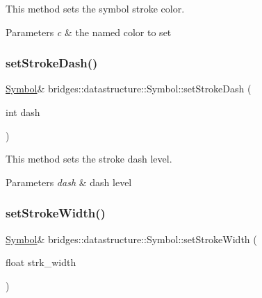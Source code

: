 This method sets the symbol stroke color. 


\begin{DoxyParams}{Parameters}
{\em c} & the named color to set \\
\hline
\end{DoxyParams}
\mbox{\label{classbridges_1_1datastructure_1_1_symbol_ac6cbd0714fef49709b85ef28de8d993c}} 
\subsubsection{\texorpdfstring{set\+Stroke\+Dash()}{setStrokeDash()}}
{\footnotesize\ttfamily \hyperlink{classbridges_1_1datastructure_1_1_symbol}{Symbol}\& bridges\+::datastructure\+::\+Symbol\+::set\+Stroke\+Dash (\begin{DoxyParamCaption}\item[{int}]{dash }\end{DoxyParamCaption})\hspace{0.3cm}{\ttfamily [inline]}}



This method sets the stroke dash level. 


\begin{DoxyParams}{Parameters}
{\em dash} & dash level \\
\hline
\end{DoxyParams}
\mbox{\label{classbridges_1_1datastructure_1_1_symbol_a7c888fae7333c7ed9edf9c33dae6ad8c}} 
\subsubsection{\texorpdfstring{set\+Stroke\+Width()}{setStrokeWidth()}}
{\footnotesize\ttfamily \hyperlink{classbridges_1_1datastructure_1_1_symbol}{Symbol}\& bridges\+::datastructure\+::\+Symbol\+::set\+Stroke\+Width (\begin{DoxyParamCaption}\item[{float}]{strk\+\_\+width }\end{DoxyParamCaption})\hspace{0.3cm}{\ttfamily [inline]}}



